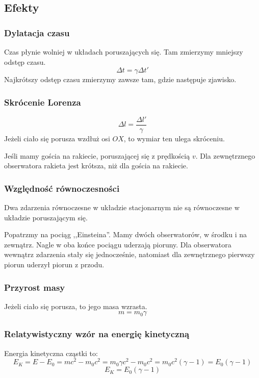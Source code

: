 \documentclass [a4paper, 11pt, oneside]{book}
\begin{document}
		\subsection{Efekty} %
		\label{sub:efekty}
			\subsubsection{Dylatacja czasu} %
			\label{ssub:dylatacja_czasu}
				Czas płynie wolniej w układach poruszających się. Tam zmierzymy mniejszy odstęp czasu.
				\[
					\Delta t = \gamma\Delta t'
				\]
				Najkrótszy odstęp czasu zmierzymy zawsze tam, gdzie następuje zjawisko.
			\subsubsection{Skrócenie Lorenza} %
			\label{ssub:skr_cenie_lorenza}
				\[
					\Delta l = \frac{\Delta l'}\gamma
				\]
				Jeżeli ciało się porusza wzdłuż osi $OX$, to wymiar ten ulega skróceniu.

				Jeśli mamy gościa na rakiecie, poruszającej się z prędkością $v$. Dla zewnętrznego obserwatora rakieta jest krótsza, niż dla gościa na rakiecie.

			\subsubsection{Względność równoczesności} %
			\label{ssub:wzgl_dno_r_wnoczesno_ci}
				Dwa zdarzenia równoczesne w układzie stacjonarnym nie są równoczesne w układzie poruszającym się.

				Popatrzmy na pociąg ,,Einsteina''. Mamy dwóch obserwatorów, w środku i na zewnątrz. Nagle w oba końce pociągu uderzają pioruny. Dla obserwatora wewnątrz zdarzenia stały się jednocześnie, natomiast dla zewnętrznego pierwszy piorun uderzył piorun z przodu.

			\subsubsection{Przyrost masy} %
			\label{ssub:przyrost_masy}
				Jeżeli ciało się porusza, to jego masa wzrasta.
				\[
					m = m_0\gamma
				\]

			\subsubsection{Relatywistyczny wzór na energię kinetyczną} %
			\label{ssub:relatywistyczny_wz_r_na_energi_kinetyczn_}
				Energia kinetyczna cząstki to:
				\[
					E_K = E-E_0 = mc^2 - m_0c^2 = m_0\gamma c^2 - m_0 c^2 = m_0 c^2(\gamma-1) = E_0(\gamma-1)
				\]
				\[
					E_K = E_0(\gamma-1)
				\]
\end{document}
